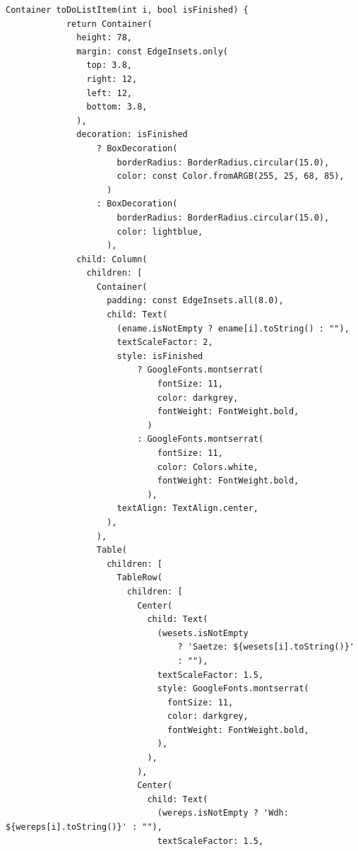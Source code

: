    \pagebreak
    \begin{lstlisting}[caption=To-Do-Liste Item Methode,label=lst:impl:frontend:qrcode]
        Container toDoListItem(int i, bool isFinished) {
            return Container(
              height: 78,
              margin: const EdgeInsets.only(
                top: 3.8,
                right: 12,
                left: 12,
                bottom: 3.8,
              ),
              decoration: isFinished
                  ? BoxDecoration(
                      borderRadius: BorderRadius.circular(15.0),
                      color: const Color.fromARGB(255, 25, 68, 85),
                    )
                  : BoxDecoration(
                      borderRadius: BorderRadius.circular(15.0),
                      color: lightblue,
                    ),
              child: Column(
                children: [
                  Container(
                    padding: const EdgeInsets.all(8.0),
                    child: Text(
                      (ename.isNotEmpty ? ename[i].toString() : ""),
                      textScaleFactor: 2,
                      style: isFinished
                          ? GoogleFonts.montserrat(
                              fontSize: 11,
                              color: darkgrey,
                              fontWeight: FontWeight.bold,
                            )
                          : GoogleFonts.montserrat(
                              fontSize: 11,
                              color: Colors.white,
                              fontWeight: FontWeight.bold,
                            ),
                      textAlign: TextAlign.center,
                    ),
                  ),
                  Table(
                    children: [
                      TableRow(
                        children: [
                          Center(
                            child: Text(
                              (wesets.isNotEmpty
                                  ? 'Saetze: ${wesets[i].toString()}'
                                  : ""),
                              textScaleFactor: 1.5,
                              style: GoogleFonts.montserrat(
                                fontSize: 11,
                                color: darkgrey,
                                fontWeight: FontWeight.bold,
                              ),
                            ),
                          ),
                          Center(
                            child: Text(
                              (wereps.isNotEmpty ? 'Wdh: ${wereps[i].toString()}' : ""),
                              textScaleFactor: 1.5,

\end{lstlisting}
